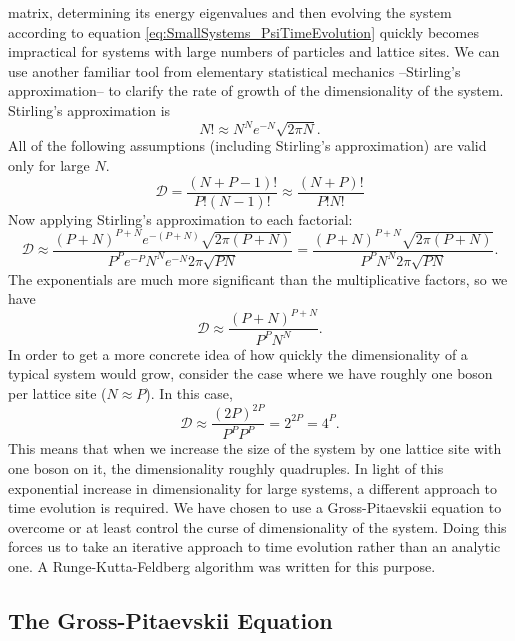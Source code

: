 \documentclass[a4paper, 10pt]{article}
\theoremstyle{plain}
\begin{document}
matrix, determining its energy eigenvalues and then evolving the system
according to equation \eqref{eq:SmallSystems_PsiTimeEvolution} quickly becomes
impractical for systems with large numbers of particles and lattice sites. We
can use another familiar tool from elementary statistical mechanics --Stirling's
approximation-- to clarify the rate of growth of the dimensionality of the
system. Stirling's approximation \cite{Schroeder2007} is
\begin{equation}
    N! \approx N^{N} e^{-N} \sqrt{2 \pi N}.
\end{equation}
All of the following assumptions (including Stirling's approximation) are
valid only for large $N$.
\begin{equation*}
    \mathcal{D} = \frac{(N + P - 1)!}{P! (N-1)!}
    \approx
    \frac{(N + P)!}{P! N!}
\end{equation*}
Now applying Stirling's approximation to each factorial:
\begin{equation*}
    \mathcal{D}
    \approx
    \frac{(P + N)^{P+N} e^{-(P + N)} \sqrt{2 \pi (P+N)}}
         {P^{P} e^{-P} N^{N} e^{-N} 2 \pi \sqrt{PN}}
    =
    \frac{(P + N)^{P+N} \sqrt{2 \pi (P+N)}}
         {P^{P} N^{N} 2\pi \sqrt{PN}}.
\end{equation*}
The exponentials are much more significant than the multiplicative factors, so
we have
\begin{equation*}
    \mathcal{D} \approx \frac{(P + N)^{P+N}}{P^P N^N}.
\end{equation*}
In order to get a more concrete idea of how quickly the dimensionality of a
typical system would grow, consider the case where we have roughly one boson
per lattice site ($N \approx P$). In this case,
\begin{equation*}
    \mathcal{D} \approx \frac{(2P)^{2P}}{P^{P} P^{P}} = 2^{2P} = 4^{P}.
\end{equation*}
This means that when we increase the size of the system by one lattice site with
one boson on it, the dimensionality roughly quadruples. In light of this
exponential increase in dimensionality for large systems, a different approach
to time evolution is required. We have chosen to use a Gross-Pitaevskii equation
to overcome or at least control the curse of dimensionality of the system. Doing
this forces us to take an iterative approach to time evolution rather than an
analytic one. A Runge-Kutta-Feldberg algorithm \cite{Burden2005} was written for
this purpose.


\subsection{The Gross-Pitaevskii Equation}
\end{document}
